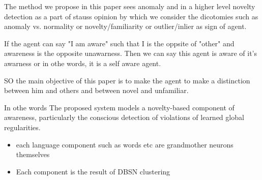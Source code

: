 \documentclass[a4paper]{article}
\begin{document}
   The method we propose in this paper sees anomaly and in a higher level novelty detection as a part of stauss opinion by which we consider the dicotomies such as  anomaly vs. normality or novelty/familiarity  or outlier/inlier as sign of agent.

   If the agent can say "I am aware" such that I is the oppsite of "other" and awareness is the opposite unawarness. Then we can say this agent is aware of it's awarness or in othe words, it is a self aware agent.

   SO the main objective of this paper is to make the agent to make a distinction between him and others and between novel and unfamiliar.

   In othe words The proposed system models a novelty-based component of awareness, particularly the conscious detection of violations of learned global regularities.

   \begin{itemize}
      \item each language component such as words etc are grandmother neurons themselves
      \item Each component is the result of DBSN clustering
   \end{itemize}

   
   
\end{document}
